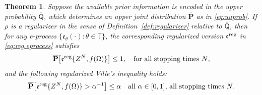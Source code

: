 \documentclass[a4paper, 12pt]{article}
\theoremstyle{plain}
\newtheorem{thm}{Theorem}
\theoremstyle{definition}
\theoremstyle{remark}
\newcommand{\TT}{\mathbb{T}}
\newcommand{\uprior}{\overline{\mathsf{Q}}}
\newcommand{\uuprob}{\mathbf{\overline{P}}}
\newcommand{\eval}{\mathfrak{e}}
\begin{document}
\begin{thm}
\label{thm:reg.ville}
Suppose the available prior information is encoded in the upper probability $\uprior$, which determines an upper joint distribution $\uuprob$ as in \eqref{eq:uuprob}.  If $\rho$ is a regularizer in the sense of Definition~\ref{def:regularizer} relative to $\uprior$, then for any e-process $\{\eval_\theta(\cdot): \theta \in \TT\}$, the corresponding regularized version $\eval^\text{\rm reg}$ in \eqref{eq:reg.eprocess} satisfies 
\begin{equation}
\label{eq:reg.ville0}
\uuprob\bigl[ \eval^\text{\rm reg}\{Z^N,f(\Omega)\} \bigr] \leq 1, \quad \text{for all stopping times $N$}, 
\end{equation}
and the following regularized Ville's inequality holds:
\begin{equation}
\label{eq:reg.ville}
\uuprob \bigl[ \eval^\text{\rm reg}\{Z^N, f(\Omega)\} > \alpha^{-1} \bigr] \leq \alpha \quad \text{all $\alpha \in [0,1]$, all stopping times $N$}. 
\end{equation}
\end{thm}
\end{document}
